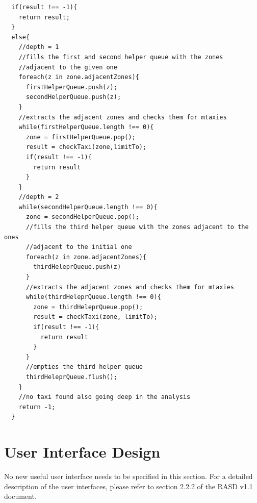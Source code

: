 \documentclass[11pt,titlepage]{article} %
\begin{document}
\begin{lstlisting}
  if(result !== -1){
    return result;
  }
  else{
    //depth = 1
    //fills the first and second helper queue with the zones
    //adjacent to the given one
    foreach(z in zone.adjacentZones){
      firstHelperQueue.push(z);
      secondHelperQueue.push(z);
    }
    //extracts the adjacent zones and checks them for mtaxies
    while(firstHelperQueue.length !== 0){
      zone = firstHelperQueue.pop();
      result = checkTaxi(zone,limitTo);
      if(result !== -1){
        return result
      }
    }
    //depth = 2
    while(secondHelperQueue.length !== 0){
      zone = secondHelperQueue.pop();
      //fills the third helper queue with the zones adjacent to the ones
      //adjacent to the initial one
      foreach(z in zone.adjacentZones){
        thirdHeleprQueue.push(z)
      }
      //extracts the adjacent zones and checks them for mtaxies
      while(thirdHeleprQueue.length !== 0){
        zone = thirdHeleprQueue.pop();
        result = checkTaxi(zone, limitTo);
        if(result !== -1){
          return result
        }
      }
      //empties the third helper queue
      thirdHeleprQueue.flush();
    }
    //no taxi found also going deep in the analysis
    return -1;
  }

\end{lstlisting}

\section{User Interface Design}
	No new useful user interface needs to be specified in this section.\newline
	For a detailed description of the user interfaces, please refer to section 2.2.2 of the RASD v1.1 document.

\newpage
\end{document}
